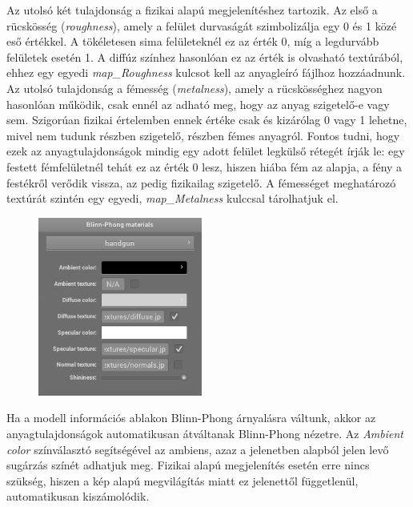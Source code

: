 Az utolsó két tulajdonság a fizikai alapú megjelenítéshez tartozik. Az első a rücskösség (\textit{roughness}), amely a felület durvaságát szimbolizálja egy 0 és 1 közé eső értékkel. A tökéletesen sima felületeknél ez az érték 0, míg a legdurvább felületek esetén 1. A diffúz színhez hasonlóan ez az érték is olvasható textúrából, ehhez egy egyedi \textit{map\_Roughness} kulcsot kell az anyagleíró fájlhoz hozzáadnunk. Az utolsó tulajdonság a fémesség (\textit{metalness}), amely a rücskösséghez nagyon hasonlóan működik, csak ennél az adható meg, hogy az anyag szigetelő-e vagy sem. Szigorúan fizikai értelemben ennek értéke csak és kizárólag 0 vagy 1 lehetne, mivel nem tudunk részben szigetelő, részben fémes anyagról. Fontos tudni, hogy ezek az anyagtulajdonságok mindig egy adott felület legkülső rétegét írják le: egy festett fémfelületnél tehát ez az érték 0 lesz, hiszen hiába fém az alapja, a fény a festékről verődik vissza, az pedig fizikailag szigetelő. A fémességet meghatározó textúrát szintén egy egyedi, \textit{map\_Metalness} kulccsal tárolhatjuk el.

\begin{figure}
    \vspace{-23pt}
    \includegraphics[width=0.48\textwidth]{images/bp_materials.png}
    \vspace{-20pt}
\end{figure}

Ha a modell információs ablakon Blinn-Phong árnyalásra váltunk, akkor az anyagtulajdonságok automatikusan átváltanak Blinn-Phong nézetre. Az \textit{Ambient color} színválasztó segítségével az ambiens, azaz a jelenetben alapból jelen levő sugárzás színét adhatjuk meg. Fizikai alapú megjelenítés esetén erre nincs szükség, hiszen a kép alapú megvilágítás miatt ez jelenettől függetlenül, automatikusan kiszámolódik.

